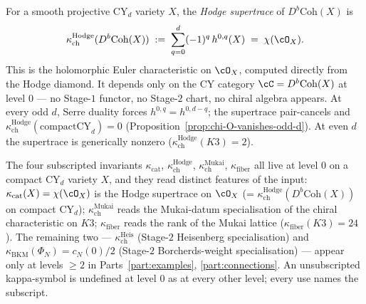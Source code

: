 \begin{definition}
\label{def:cy-cat-hodge-supertrace}
For a smooth projective CY$_d$ variety $X$, the
\emph{Hodge supertrace} of $D^b\mathrm{Coh}(X)$ is
\[
 \kappa_{\mathrm{ch}}^{\mathrm{Hodge}}(D^b\mathrm{Coh}(X))
 \;:=\;
 \sum_{q = 0}^{d} (-1)^q\, h^{0, q}(X)
 \;=\;
 \chi(\cO_X).
\]
This is the holomorphic Euler characteristic on $\cO_X$, computed
directly from the Hodge diamond. It depends only on the CY category
$\cC = D^b\mathrm{Coh}(X)$ at level $0$ — no Stage-$1$ functor, no
Stage-$2$ chart, no chiral algebra appears. At every odd $d$, Serre
duality forces $h^{0, q} = h^{0, d-q}$; the supertrace pair-cancels
and $\kappa_{\mathrm{ch}}^{\mathrm{Hodge}}(\mathrm{compact CY}_d) = 0$
(Proposition~\ref{prop:chi-O-vanishes-odd-d}). At even $d$ the
supertrace is generically nonzero
($\kappa_{\mathrm{ch}}^{\mathrm{Hodge}}(K3) = 2$).
\end{definition}

\begin{remark}
\label{rem:cy-cat-bare-kappa-forbidden}
The four subscripted invariants $\kappa_{\mathrm{cat}}$,
$\kappa_{\mathrm{ch}}^{\mathrm{Hodge}}$,
$\kappa_{\mathrm{ch}}^{\mathrm{Mukai}}$, $\kappa_{\mathrm{fiber}}$
all live at level $0$ on a compact CY$_d$ variety $X$, and they read
distinct features of the input:
$\kappa_{\mathrm{cat}}(X) = \chi(\cO_X)$ is the Hodge supertrace on
$\cO_X$ (= $\kappa_{\mathrm{ch}}^{\mathrm{Hodge}}(D^b\mathrm{Coh}(X))$
on compact CY$_d$);
$\kappa_{\mathrm{ch}}^{\mathrm{Mukai}}$ reads the Mukai-datum
specialisation of the chiral characteristic on $K3$;
$\kappa_{\mathrm{fiber}}$ reads the rank of the Mukai lattice
($\kappa_{\mathrm{fiber}}(K3) = 24$). The remaining two —
$\kappa_{\mathrm{ch}}^{\mathrm{Heis}}$ (Stage-$2$ Heisenberg
specialisation) and $\kappa_{\mathrm{BKM}}(\Phi_N) = c_N(0)/2$
(Stage-$2$ Borcherds-weight specialisation) — appear only at
levels $\geq 2$ in Parts~\ref{part:examples}, \ref{part:connections}.
An unsubscripted kappa-symbol is undefined at level $0$ as at every other level;
every use names the subscript.
\end{remark}

